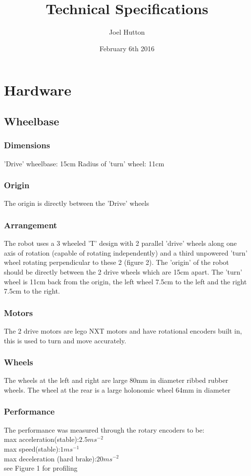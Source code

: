 \documentclass[a4paper]{article}
\title{Technical Specifications}
\author{Joel Hutton}
\date{February 6th 2016}
\begin{document}
\maketitle
\section{Hardware}

\subsection{Wheelbase}
\subsubsection{Dimensions}
'Drive' wheelbase:		15cm \newline
Radius of 'turn' wheel: 11cm
\subsubsection{Origin}
The origin is directly between the 'Drive' wheels
\subsubsection{Arrangement}
The robot uses a 3 wheeled 'T' design with 2 parallel 'drive' wheels along one axis of rotation (capable of rotating independently) and a third unpowered 'turn' wheel rotating perpendicular to these 2 (figure 2). The 'origin' of the robot should be 
directly between the 2 drive wheels which are 15cm apart. The 'turn' wheel 
is 11cm back from the origin, the left wheel 7.5cm to the left and the right
7.5cm to the right. 

\subsubsection{Motors}
The 2 drive motors are lego NXT motors and have rotational encoders built in, this is used to turn and move accurately. 
\subsubsection{Wheels}
The wheels at the left and right are large 80mm in diameter ribbed rubber wheels. The wheel at the rear is a large holonomic wheel 64mm in diameter
\subsubsection{Performance}
The performance was measured through the rotary encoders to be:\\
max acceleration(stable):$2.5ms^{-2}$\\
max speed(stable):$1ms^{-1}$ \\
max deceleration (hard brake):$20ms^{-2}$\\
see Figure 1 for profiling\\
\end{document}
